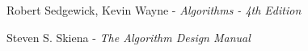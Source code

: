 Robert Sedgewick, Kevin Wayne - \emph{Algorithms - 4th Edition}

Steven S. Skiena - \emph{The Algorithm Design Manual}

